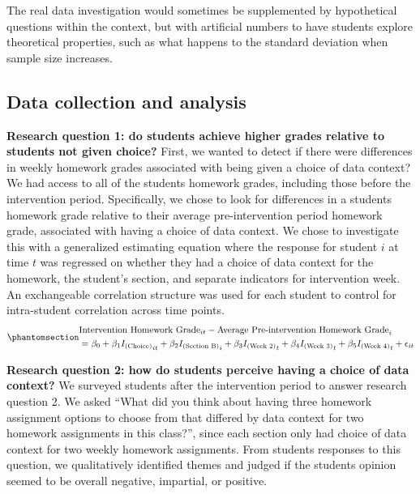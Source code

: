 \documentclass[
  12pt]{article}
\begin{document}
The real data investigation would sometimes be supplemented by
hypothetical questions within the context, but with artificial numbers
to have students explore theoretical properties, such as what happens to
the standard deviation when sample size increases.

\subsection{Data collection and
analysis}\label{data-collection-and-analysis}

\textbf{Research question 1: do students achieve higher grades relative
to students not given choice?} First, we wanted to detect if there were
differences in weekly homework grades associated with being given a
choice of data context? We had access to all of the students homework
grades, including those before the intervention period. Specifically, we
chose to look for differences in a students homework grade relative to
their average pre-intervention period homework grade, associated with
having a choice of data context. We chose to investigate this with a
generalized estimating equation where the response for student \(i\) at
time \(t\) was regressed on whether they had a choice of data context
for the homework, the student's section, and separate indicators for
intervention week. An exchangeable correlation structure was used for
each student to control for intra-student correlation across time
points. \begin{equation}\phantomsection\label{eq-hw}{
\begin{split}
&\text{Intervention Homework Grade}_{it} - \text{Average Pre-intervention Homework Grade}_{i}\\
&= \beta_0 + \beta_1 {I_{(\text{Choice})}}_{it} + \beta_2 {I_{(\text{Section B})}}_{i} + \beta_3 {I_{(\text{Week 2})}}_{t} + \beta_4 {I_{(\text{Week 3})}}_t + \beta_5 {I_{(\text{Week 4})}}_t + \epsilon_{it}
\end{split}
}\end{equation}

\textbf{Research question 2: how do students perceive having a choice of
data context?} We surveyed students after the intervention period to
answer research question 2. We asked ``What did you think about having
three homework assignment options to choose from that differed by data
context for two homework assignments in this class?'', since each
section only had choice of data context for two weekly homework
assignments. From students responses to this question, we qualitatively
identified themes and judged if the students opinion seemed to be
overall negative, impartial, or positive.
\end{document}

